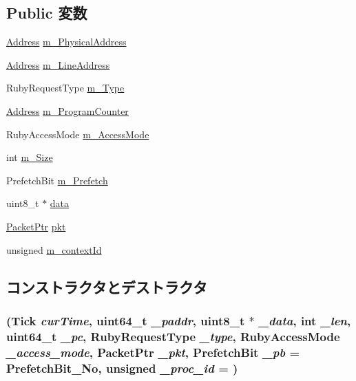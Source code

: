 \subsection*{Public 変数}
\begin{DoxyCompactItemize}
\item 
\hyperlink{classAddress}{Address} \hyperlink{classRubyRequest_a7c96109098594912107df11d774fb074}{m\_\-PhysicalAddress}
\item 
\hyperlink{classAddress}{Address} \hyperlink{classRubyRequest_a6c03709bdb08697b25ef39357b680a2a}{m\_\-LineAddress}
\item 
RubyRequestType \hyperlink{classRubyRequest_a0af11cf356fee21e4efa5af9c04f899f}{m\_\-Type}
\item 
\hyperlink{classAddress}{Address} \hyperlink{classRubyRequest_a969946fed3bff0265b5fb26d9142020d}{m\_\-ProgramCounter}
\item 
RubyAccessMode \hyperlink{classRubyRequest_ad96100499e61560c3eabb53df1a36b3a}{m\_\-AccessMode}
\item 
int \hyperlink{classRubyRequest_a75eae7d22f07ee4b6bd79aca92932601}{m\_\-Size}
\item 
PrefetchBit \hyperlink{classRubyRequest_af0ed8dc909378d2f8109d2c4a97d9495}{m\_\-Prefetch}
\item 
uint8\_\-t $\ast$ \hyperlink{classRubyRequest_abe222f6d3581e7920dcad5306cc906a8}{data}
\item 
\hyperlink{classPacket}{PacketPtr} \hyperlink{classRubyRequest_a3a891bc2a0fcbe6be5297077d94e2df7}{pkt}
\item 
unsigned \hyperlink{classRubyRequest_aa37a0c2dd13f87bc0eccc95587a92d71}{m\_\-contextId}
\end{DoxyCompactItemize}


\subsection{コンストラクタとデストラクタ}
\hypertarget{classRubyRequest_addadf754744cca088ebfc27c8749f0e1}{
\subsubsection[{RubyRequest}]{ ({\bf Tick} {\em curTime}, \/  uint64\_\-t {\em \_\-paddr}, \/  uint8\_\-t $\ast$ {\em \_\-data}, \/  int {\em \_\-len}, \/  uint64\_\-t {\em \_\-pc}, \/  RubyRequestType {\em \_\-type}, \/  RubyAccessMode {\em \_\-access\_\-mode}, \/  {\bf PacketPtr} {\em \_\-pkt}, \/  PrefetchBit {\em \_\-pb} = {\ttfamily PrefetchBit\_\-No}, \/  unsigned {\em \_\-proc\_\-id} = {})}}
\label{classRubyRequest_addadf754744cca088ebfc27c8749f0e1}



